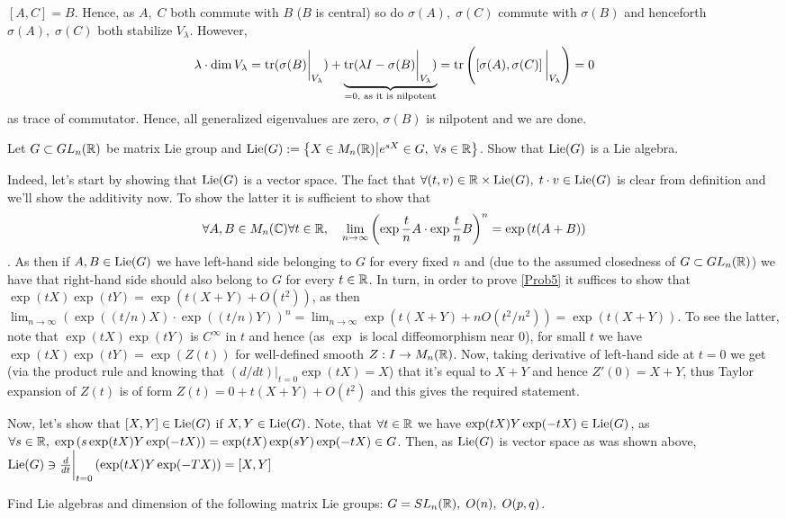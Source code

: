 \documentclass[8pt]{article} %
\newcommand{\Lie}{\mbox{\normalfont{Lie}}}
\newcommand{\tr}{\mbox{\normalfont{tr}}}
\newcommand{\myprobshort}[2]{\begin{myprob}[#1]#2\end{myprob}}
\begin{document}
$[A,C]=B$. Hence, as $A,\;C$ both commute with $B$ ($B$ is central) so do $\sigma(A),\;\sigma(C)$ commute with $\sigma(B)$
and henceforth $\sigma(A),\;\sigma(C)$ both stabilize $V_\lambda$. However,
\[\lambda\cdot\dim V_\lambda=\tr(\sigma(B)\bigg|_{ V_\lambda })+\underbrace{\tr(\lambda I-\sigma(B)\bigg|_{ V_\lambda })}_{
	=0,\text{ as it is nilpotent}}=\tr\mybra{ \mysbra{ \sigma(A),\sigma(C) } \bigg|_{ V_\lambda }}=0\]
	as trace of commutator. Hence, all generalized eigenvalues are zero, $\sigma(B)$ is nilpotent and we are done.
\myprobshort{April 14}{Let $G\subset GL_n(\mathbb{R})$ be matrix Lie group and $\Lie(G):=\mysetn{X\in M_n(\R)}{e^{ sX }\in G,\;\forall
s\in\R}$. Show that $\Lie(G)$ is a Lie algebra.}
Indeed, let's start by showing that $\Lie(G)$ is a vector space. The fact that $\forall(t,v)\in\R\times\Lie(G),\;t\cdot v\in
\Lie(G)$ is clear from definition and we'll show the additivity now. To show the latter it is sufficient to show
that \begin{equation}\label{Prob5}\forall A,B\in M_n(\C)\forall t\in\R
	,\quad\lim_{n\to\infty}\mybra{ \exp\frac{t}{n}A\cdot\exp\frac{ t }{ n }B
}^n=\exp\mybra{ t(A+B) }\end{equation}.
As then if $A,B\in\Lie(G)$ we have left-hand side belonging to $G$ for every fixed $n$ and (due to the assumed closedness
of $G\subset GL_n(\mathbb{R})$) we have that right-hand side should also belong to $G$ for every $t\in\mathbb{R}$. In turn, in order
to prove \ref{Prob5} it suffices to show that $\exp(tX)\exp(tY)=\exp(t(X+Y)+O(t^2))$, as then $\lim_{n\to\infty}
(\exp((t/n)X)\cdot\exp((t/n)Y))^n=\lim_{ n\to\infty }\exp(t(X+Y)+nO(t^2/n^2))=\exp(t(X+Y))$. To see the latter,
note that $\exp(tX)\exp(tY)$ is $C^\infty$ in $t$ and hence (as $\exp$ is local diffeomorphism near 0),
for small $t$ we have $\exp(tX)\exp(tY)=\exp(Z(t))$ for well-defined smooth $Z:I\to M_n(\mathbb{R})$. Now, taking derivative 
of left-hand side at $t=0$ we get (via the product rule and knowing that $(d/dt)\big|_{ t=0 }\exp(tX)=X$)
that it's equal to $X+Y$ and hence $Z'(0)=X+Y$, thus Taylor expansion of $Z(t)$ is of form $Z(t)=0+t(X+Y)+O(t^2)$ and
this gives the required statement.\par
Now, let's show that $[X,Y]\in \Lie(G)$ if $X,Y\in\Lie(G)$. Note, that $\forall t\in\mathbb{R}$ we have $\exp(tX)Y\exp(-tX)\in
\Lie(G)$, as $\forall s\in\mathbb{R},\;\exp\left( s\exp(tX)Y\exp(-tX) \right)=\exp(tX)\exp(sY)\exp(-tX)\in G$. Then,
as $\Lie(G)$ is vector space as was shown above, $\Lie(G)\ni\frac{d}{dt}\bigg|_{ t=0 }\mybra{ \exp(tX)Y\exp(-TX) }=
[X,Y]$
\myprobshort{ April 14 }{ Find Lie algebras and dimension of the following matrix Lie groups: $G=SL_n(\mathbb{R}),\;O(n),\;O(p,q)$. }
\end{document}
